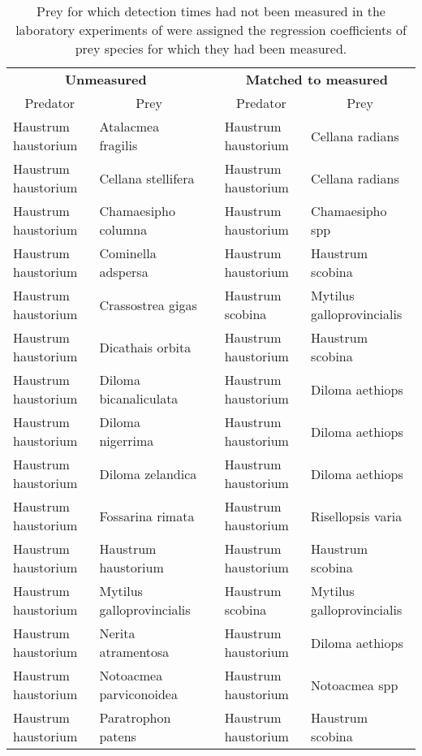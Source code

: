 \begin{table}[!htbp]
\caption{Prey for which detection times had not been measured in the laboratory experiments of \citep{Novak:2013qg} were assigned the regression coefficients of prey species for which they had been measured.\label{tab:matches}} 
\begin{center}
\begin{tabular}{llcll}
\hline
\multicolumn{2}{c}{\bfseries Unmeasured}&\multicolumn{1}{c}{\bfseries }&\multicolumn{2}{c}{\bfseries Matched to measured}\tabularnewline
\cline{1-2} \cline{4-5}
\multicolumn{1}{c}{Predator}&\multicolumn{1}{c}{Prey}&\multicolumn{1}{c}{}&\multicolumn{1}{c}{Predator}&\multicolumn{1}{c}{Prey}\tabularnewline
\hline
Haustrum haustorium&Atalacmea fragilis&&Haustrum haustorium&Cellana radians\tabularnewline
Haustrum haustorium&Cellana stellifera&&Haustrum haustorium&Cellana radians\tabularnewline
Haustrum haustorium&Chamaesipho columna&&Haustrum haustorium&Chamaesipho spp\tabularnewline
Haustrum haustorium&Cominella adspersa&&Haustrum haustorium&Haustrum scobina\tabularnewline
Haustrum haustorium&Crassostrea gigas&&Haustrum scobina&Mytilus galloprovincialis\tabularnewline
Haustrum haustorium&Dicathais orbita&&Haustrum haustorium&Haustrum scobina\tabularnewline
Haustrum haustorium&Diloma bicanaliculata&&Haustrum haustorium&Diloma aethiops\tabularnewline
Haustrum haustorium&Diloma nigerrima&&Haustrum haustorium&Diloma aethiops\tabularnewline
Haustrum haustorium&Diloma zelandica&&Haustrum haustorium&Diloma aethiops\tabularnewline
Haustrum haustorium&Fossarina rimata&&Haustrum haustorium&Risellopsis varia\tabularnewline
Haustrum haustorium&Haustrum haustorium&&Haustrum haustorium&Haustrum scobina\tabularnewline
Haustrum haustorium&Mytilus galloprovincialis&&Haustrum scobina&Mytilus galloprovincialis\tabularnewline
Haustrum haustorium&Nerita atramentosa&&Haustrum haustorium&Diloma aethiops\tabularnewline
Haustrum haustorium&Notoacmea parviconoidea&&Haustrum haustorium&Notoacmea spp\tabularnewline
Haustrum haustorium&Paratrophon patens&&Haustrum haustorium&Haustrum scobina\tabularnewline

\end{tabular}
\end{center}
\end{table}
